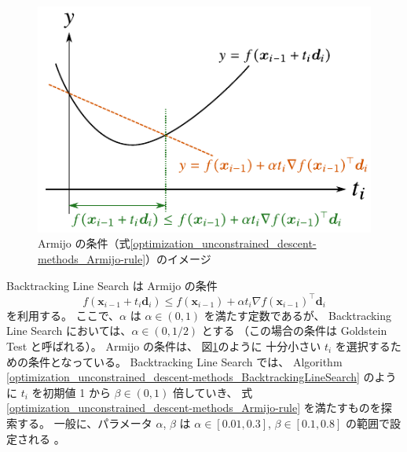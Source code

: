 \begin{figure}[tp]
    \centering
    \includegraphics[width=0.7\linewidth]{optimization/Armijo-rule-image.pdf}
    \caption{Armijo の条件（式\eqref{optimization_unconstrained_descent-methods_Armijo-rule}）のイメージ}
    \label{optimization_unconstrained_descent-methods_Armijo-rule-image}
\end{figure}

Backtracking Line Search \cite[Section 9.2]{Boyd2004} は
Armijo の条件 \cite[Section 7.5]{Luenberger2003}
\begin{equation}
    f(\bm{x}_{i-1} + t_i \bm{d}_i) \le f(\bm{x}_{i-1}) + \alpha t_i \nabla f(\bm{x}_{i-1})^\top \bm{d}_i
    \label{optimization_unconstrained_descent-methods_Armijo-rule}
\end{equation}
を利用する。
ここで、$\alpha$ は $\alpha \in (0,1)$ を満たす定数であるが、
Backtracking Line Search においては、$\alpha \in (0, 1/2)$ とする
（この場合の条件は Goldstein Test \cite[Section 7.5]{Luenberger2003} と呼ばれる）。
Armijo の条件は、
図\ref{optimization_unconstrained_descent-methods_Armijo-rule-image}のように
十分小さい $t_i$ を選択するための条件となっている。
Backtracking Line Search では、
Algorithm \ref{optimization_unconstrained_descent-methods_BacktrackingLineSearch}
のように
$t_i$ を初期値 1 から $\beta \in (0, 1)$ 倍していき、
式 \eqref{optimization_unconstrained_descent-methods_Armijo-rule} を満たすものを探索する。
一般に、パラメータ $\alpha$, $\beta$ は
$\alpha \in [0.01, 0.3]$, $\beta \in [0.1, 0.8]$ の範囲で設定される
\cite[Section 9.2]{Boyd2004}。
